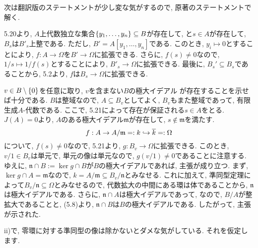 \documentclass[dvipdfmx]{jsarticle}
\begin{document}
    \color{red}
    次は翻訳版のステートメントが少し変な気がするので, 原著のステートメントで解く.
    \color{black}

    \begin{problem}
        5.20より, $A$上代数独立な集合$\{y_1, \dots, y_n\} \subseteq B$が存在して,
        と$s \in A$が存在して, $B_s$は$B'_s$上整である.
        ただし, $B' = A[y_1, \dots, y_n]$である.
        このとき, $y_i \mapsto 0$とすることにより, $f: A\to \Omega$を$B' \to \Omega$に拡張できる.
        さらに, $f(s) \neq 0$なので, $1/s \mapsto 1/f(s)$とすることにより, $B'_s \to \Omega$に拡張できる.
        最後に, $B_s' \subseteq B_s$であることから,
        5.2より, $f$は$B_s \to \Omega$に拡張できる.
    \end{problem}

    \begin{problem}
        $v \in B \setminus \{0\}$を任意に取り, $v$を含まない$B$の極大イデアル
        が存在することを示せば十分である.
        $B$は整域なので, $A \subseteq B_v$としてよく, $B_v$もまた整域であって,
        有限生成$A$-代数である.
        ここで, 5.21によって存在が保証される$s \in A$をとる.
        $J(A) = 0$より, $A$のある極大イデアル$\mathfrak{m}$が存在して, $s \notin \mathfrak{m}$を満たす.
        \[
            f: A \to A/\mathfrak{m} =: k \hookrightarrow \overline{k} =: \Omega
        \]
        について, $f(s) \neq 0$なので, 5.21より, $g: B_v \to \Omega$に拡張できる.
        このとき, $v/1 \in B_v$は単元で, 単元の像は単元なので, $g(v/1) \neq 0$であることに注意する.
        ゆえに, $\mathfrak{n} \cap B := \ker{g} \cap B$が$B$の極大イデアルであれば, 主張が成り立つ.
        まず, $\ker{g} \cap A = \mathfrak{m}$なので,
        $k = A/\mathfrak{m} \subseteq B_v/\mathfrak{n}$とみなせる.
        これに加えて, 準同型定理によって$B_v/\mathfrak{n} \subseteq \Omega$とみなせるので,
        代数拡大の中間にある環は体であることから, $\mathfrak{n}$は極大イデアルである.
        さらに, $\mathfrak{n} \cap A$は極大イデアルであって,
        なので, $B/A$が整拡大であることと, (5.8)より, $\mathfrak{n} \cap B$は$B$の極大イデアルである.
        したがって, 主張が示された.
    \end{problem}

    \color{red}
    ii)で, 零環に対する準同型の像は除かないとダメな気がしている.
    それを仮定します.
    \color{black}
\end{document}
